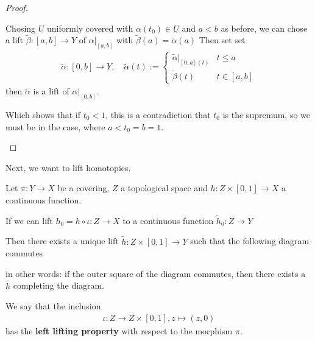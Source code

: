\begin{proof}
\begin{itemize}
      Chosing $U$ uniformly covered with $\alpha(t_0) \in U$ and $a<b$ as before, we can chose a lift $\tilde{\beta}:[a,b] \to  Y$ of $\alpha|_{[a,b]}$ with $\tilde{\beta}(a) = \tilde{\alpha}(a)$
      Then set set
      \begin{align*}
        \tilde{\alpha}:[0,b] \to  Y, \quad \tilde{\alpha}(t) := \left\{\begin{array}{ll}
            \tilde{\alpha}|_{[0,a](t)} & t \leq a\\
            \tilde{\beta}(t) &  t \in [a,b]
        \end{array} \right.
      \end{align*}
      then $\tilde{\alpha}$ is a lift of $\alpha|_{[0,b]}$.

      Which shows that if $t_0<1$, this is a contradiction that $t_0$ is the supremum, so we must be in the case, where $a < t_0 = b = 1$.
  \end{itemize}
\end{proof}

Next, we want to lift homotopies.
\begin{lem}[]\label{lem:homotopy-lift}
  Let $\pi: Y \to X$ be a covering, $Z$ a topological space and $h: Z \times [0,1] \to  X$ a continuous function.

  If we can lift $h_0 = h \circ \iota: Z \to X$ to a continuous function $\tilde{h}_0: Z \to Y$

  Then there exists a unique lift $\tilde{h}:Z \times [0,1] \to Y$ such that the following diagram commutes
  \begin{center}
  \end{center}
  in other words: if the outer square of the diagram commutes, then there exists a $\tilde{h}$ completing the diagram.

\end{lem}
\begin{rem}[]
  We say that the inclusion
  \begin{align*}
    \iota: Z \to Z \times [0,1], z \mapsto (z,0)
  \end{align*}
  has the \textbf{left lifting property} with respect to the morphism $\pi$.
\end{rem}
